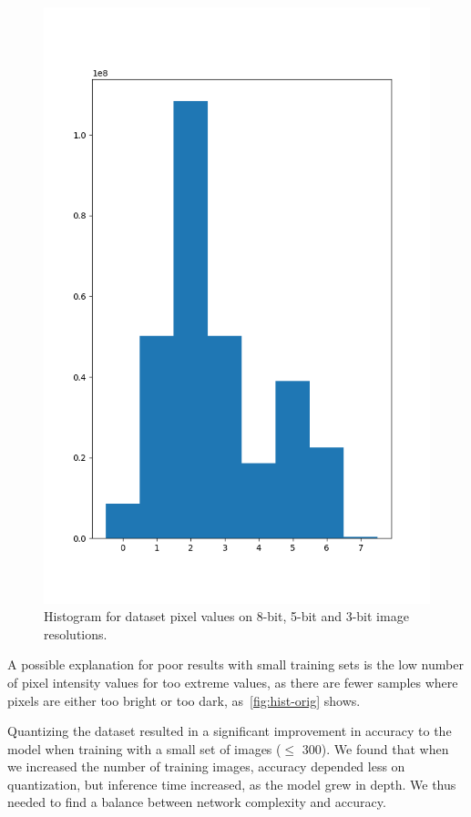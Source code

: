 \begin{figure}[h]
  \includegraphics[scale=0.3]{imgs/hist_3.png}
  \caption{Histogram for dataset pixel values on 8-bit, 5-bit and 3-bit image
    resolutions.\label{fig:hist-orig}}
\end{figure}

A possible explanation for poor results with small training sets is the low number of pixel
intensity values for too extreme values, as there are fewer samples where pixels are either too
bright or too dark, as~\autoref{fig:hist-orig} shows.


Quantizing the dataset resulted in a significant improvement in accuracy to the model when training
with a small set of images ($\leq$ 300). We found that when we increased the number of training
images, accuracy depended less on quantization, but inference time increased, as the model grew in
depth. We thus needed to find a balance between network complexity and accuracy.

